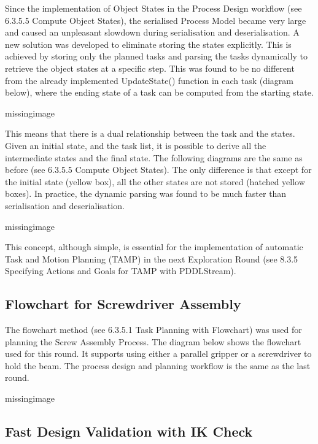 Since the implementation of Object States in the Process Design workflow (see 6.3.5.5 Compute Object States), the serialised Process Model became very large and caused an unpleasant slowdown during serialisation and deserialisation. A new solution was developed to eliminate storing the states explicitly. 
This is achieved by storing only the planned tasks and parsing the tasks dynamically to retrieve the object states at a specific step. This was found to be no different from the already implemented UpdateState() function in each task (diagram below), where the ending state of a task can be computed from the starting state. 

missingimage

This means that there is a dual relationship between the task and the states. Given an initial state, and the task list, it is possible to derive all the intermediate states and the final state. The following diagrams are the same as before (see 6.3.5.5 Compute Object States). The only difference is that except for the initial state (yellow box), all the other states are not stored (hatched yellow boxes). In practice, the dynamic parsing was found to be much faster than serialisation and deserialisation.

missingimage

This concept, although simple, is essential for the implementation of automatic Task and Motion Planning (TAMP) in the next Exploration Round (see 8.3.5 Specifying Actions and Goals for TAMP with PDDLStream).

\subsection{Flowchart for Screwdriver Assembly}
\label{subsection:exploration_4_flowchart_for_screwdriver_assembly}

The flowchart method (see 6.3.5.1 Task Planning with Flowchart) was used for planning the Screw Assembly Process. The diagram below shows the flowchart used for this round. It supports using either a parallel gripper or a screwdriver to hold the beam. The process design and planning workflow is the same as the last round.

missingimage

\subsection{Fast Design Validation with IK Check}
\label{subsection:exploration_4_fast_design_validation_with_ik_check}

